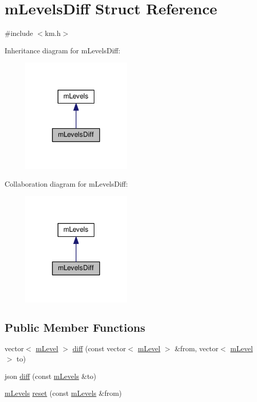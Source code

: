 \hypertarget{struct_k_1_1m_levels_diff}{}\section{m\+Levels\+Diff Struct Reference}
\label{struct_k_1_1m_levels_diff}


{\ttfamily \#include $<$km.\+h$>$}



Inheritance diagram for m\+Levels\+Diff\+:
\nopagebreak
\begin{figure}[H]
\begin{center}
\leavevmode
\includegraphics[width=149pt]{struct_k_1_1m_levels_diff__inherit__graph}
\end{center}
\end{figure}


Collaboration diagram for m\+Levels\+Diff\+:
\nopagebreak
\begin{figure}[H]
\begin{center}
\leavevmode
\includegraphics[width=149pt]{struct_k_1_1m_levels_diff__coll__graph}
\end{center}
\end{figure}
\subsection*{Public Member Functions}
\begin{DoxyCompactItemize}
\item 
vector$<$ \hyperlink{struct_k_1_1m_level}{m\+Level} $>$ \hyperlink{struct_k_1_1m_levels_diff_a6fd99c3b5cd57a816d2f91b875644b96}{diff} (const vector$<$ \hyperlink{struct_k_1_1m_level}{m\+Level} $>$ \&from, vector$<$ \hyperlink{struct_k_1_1m_level}{m\+Level} $>$ to)
\item 
json \hyperlink{struct_k_1_1m_levels_diff_a5584a114a1439afa0e01f475c1272e7e}{diff} (const \hyperlink{struct_k_1_1m_levels}{m\+Levels} \&to)
\item 
\hyperlink{struct_k_1_1m_levels}{m\+Levels} \hyperlink{struct_k_1_1m_levels_diff_a8e16cdf30d6439e131fac3807429dec4}{reset} (const \hyperlink{struct_k_1_1m_levels}{m\+Levels} \&from)
\end{DoxyCompactItemize}

